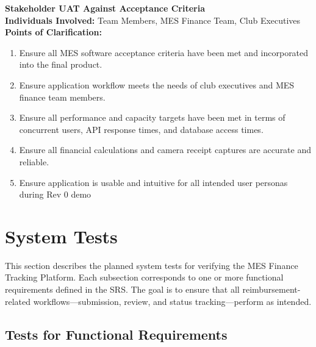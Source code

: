 \documentclass[12pt, titlepage]{article}
\begin{document}



\noindent\textbf{Stakeholder UAT Against Acceptance Criteria} \\
\noindent\textbf{Individuals Involved:} Team Members, MES Finance Team, Club Executives \\
\noindent\textbf{Points of Clarification:}
\begin{enumerate}
  \item Ensure all MES software acceptance criteria have been met and incorporated into the final product.
  \item Ensure application workflow meets the needs of club executives and MES finance team members.
  \item Ensure all performance and capacity targets have been met in terms of concurrent users, API response times, and database access times.
  \item Ensure all financial calculations and camera receipt captures are accurate and reliable.
  \item Ensure application is usable and intuitive for all intended user personas during Rev 0 demo
\end{enumerate}

\section{System Tests}


This section describes the planned system tests for verifying the MES Finance Tracking Platform. 
Each subsection corresponds to one or more functional requirements defined in the SRS.
 The goal is to ensure that all reimbursement-related workflows—submission, review, and status tracking—perform as intended.

\subsection{Tests for Functional Requirements}
\end{document}
